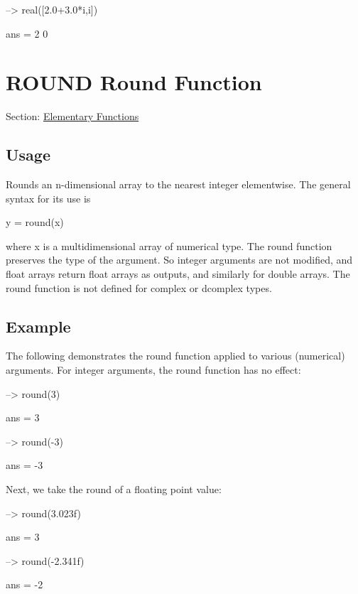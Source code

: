 \begin{DoxyVerbInclude}
--> real([2.0+3.0*i,i])

ans = 
 2 0 
\end{DoxyVerbInclude}
 \hypertarget{elementary_round}{}\section{R\-O\-U\-N\-D Round Function}\label{elementary_round}
Section\-: \hyperlink{sec_elementary}{Elementary Functions} \hypertarget{vtkwidgets_vtkxyplotwidget_Usage}{}\subsection{Usage}\label{vtkwidgets_vtkxyplotwidget_Usage}
Rounds an n-\/dimensional array to the nearest integer elementwise. The general syntax for its use is \begin{DoxyVerb}   y = round(x)
\end{DoxyVerb}
 where {\ttfamily x} is a multidimensional array of numerical type. The {\ttfamily round} function preserves the type of the argument. So integer arguments are not modified, and {\ttfamily float} arrays return {\ttfamily float} arrays as outputs, and similarly for {\ttfamily double} arrays. The {\ttfamily round} function is not defined for {\ttfamily complex} or {\ttfamily dcomplex} types. \hypertarget{variables_struct_Example}{}\subsection{Example}\label{variables_struct_Example}
The following demonstrates the {\ttfamily round} function applied to various (numerical) arguments. For integer arguments, the round function has no effect\-:


\begin{DoxyVerbInclude}
--> round(3)

ans = 
 3 

--> round(-3)

ans = 
 -3 
\end{DoxyVerbInclude}


Next, we take the {\ttfamily round} of a floating point value\-:


\begin{DoxyVerbInclude}
--> round(3.023f)

ans = 
 3 

--> round(-2.341f)

ans = 
 -2 
\end{DoxyVerbInclude}


